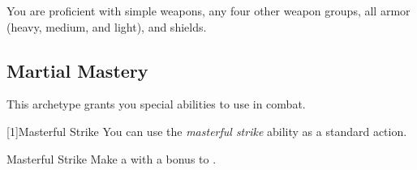         You are proficient with simple weapons, any four other weapon groups, all armor (heavy, medium, and light), and shields.

    \subsection{Martial Mastery}
        This archetype grants you special abilities to use in combat.

        [1]{Masterful Strike} You can use the \textit{masterful strike} ability as a standard action.
        \begin{freeability}{Masterful Strike}
            Make a  with a  bonus to .
        \end{freeability}

